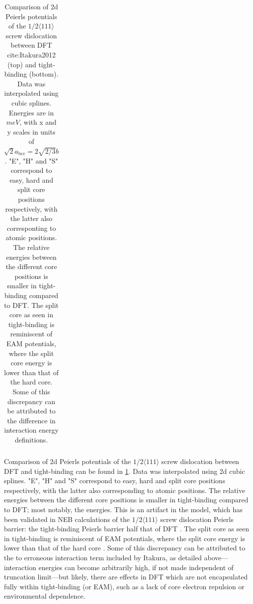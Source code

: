 \documentclass[a4paper,11pt]{article}
\begin{document}
\begin{table}
\begin{tabular}{c}
    \end{tabular}		
\caption{Comparison of 2d Peierls potentials of the $1/2\langle 111\rangle$ screw dislocation between DFT cite:Itakura2012 (top) and tight-binding (bottom). Data was interpolated using cubic splines. Energies are in $meV$, with x and y scales in units of $\sqrt{2} a_{\text{bcc}} = 2\sqrt{2/3}b$. "E", "H" and "S" correspond to easy, hard and split core positions respectively, with the latter also corresponting to atomic positions. The relative energies between the different core positions is smaller in tight-binding compared to DFT. The split core as seen in tight-binding is reminiscent of EAM potentials, where the split core energy is lower than that of the hard core. Some of this discrepancy can be attributed to the difference in interaction energy definitions.}
	\label{fig:peierlspot}
    \end{table}



Comparison of 2d Peierls potentials of the \(1/2\langle 111 \rangle\) screw dislocation between DFT and
tight-binding can be found in \ref{fig:peierlspot}. Data was interpolated using 2d cubic splines. "E", "H" and "S"
correspond to easy, hard and split core positions respectively, with the latter also
corresponding to atomic positions. The relative energies between the different core
positions is smaller in tight-binding compared to DFT; most notably, the energies. This is
an artifact in the model, which has been validated in NEB calculations of the \(1/2\langle 111\rangle\)
screw dislocation Peierls barrier: the tight-binding Peierls barrier half that of DFT
\cite{Simpson2019}. The split core as seen in tight-binding is reminiscent of EAM potentials,
where the split core energy is lower than that of the hard core \cite{Itakura2012}. Some of
this discrepancy can be attributed to the to erroneous interaction term included by Itakura,
as detailed above---interaction energies can become arbitrarily high, if not made independent of
truncation limit---but likely, there are effects in DFT which are not encapsulated fully
within tight-binding (or EAM), such as a lack of core electron repulsion or environmental
dependence. 
\end{document}
